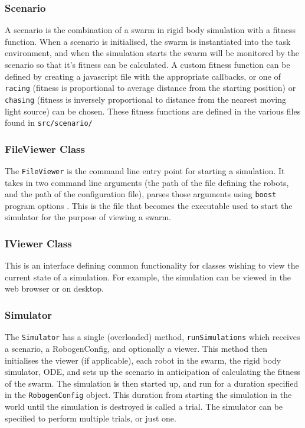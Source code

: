 \documentclass[11pt,a4paper]{article}
\begin{document}
\subsubsection{Scenario}
A scenario is the combination of a swarm in rigid body simulation with a
fitness function. When a scenario is initialised, the swarm is instantiated
into the task environment, and when the simulation starts the swarm will be
monitored by the scenario so that it's fitness can be calculated. A custom
fitness function can be defined by creating a javascript file with the
appropriate callbacks, or one of \texttt{racing} (fitness is proportional to
average distance from the starting position) or \texttt{chasing} (fitness is
inversely proportional to distance from the nearest moving light source) can be
chosen. These fitness functions are defined in the various files found in
\texttt{src/scenario/}

\subsubsection{FileViewer Class}
The \texttt{FileViewer} is the command line entry point for starting a
simulation. It takes in two command line arguments (the path of the file
defining the robots, and the path of the configuration file), parses those
arguments using \texttt{boost} program options \cite{boost}. This is the file
that becomes the executable used to start the simulator for the purpose of
viewing a swarm.

\subsubsection{IViewer Class}
This is an interface defining common functionality for classes wishing to view
the current state of a simulation. For example, the simulation can be viewed in
the web browser or on desktop.

\subsubsection{Simulator}
The \texttt{Simulator} has a single (overloaded) method,
\texttt{runSimulations} which receives a scenario, a RobogenConfig, and
optionally a viewer. This method then initialises the viewer (if applicable),
each robot in the swarm, the rigid body simulator, ODE, and sets up the
scenario in anticipation of calculating the fitness of the swarm. The
simulation is then started up, and run for a duration specified in the
\texttt{RobogenConfig} object. This duration from starting the simulation in
the world until the simulation is destroyed is called a trial. The simulator
can be specified to perform multiple trials, or just one.
\end{document}
